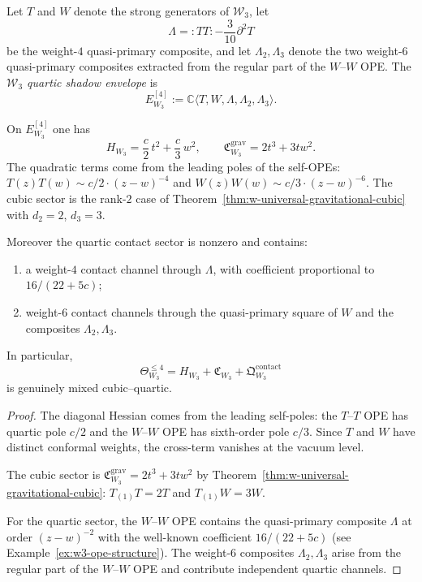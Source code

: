 \begin{definition}
\label{def:w-w3-quartic-envelope}
Let $T$ and $W$ denote the strong generators of $\mathcal{W}_3$, let
\[
\Lambda={:}TT{:}-\frac{3}{10}\partial^2T
\]
be the weight-$4$ quasi-primary composite, and let $\Lambda_2,\Lambda_3$
denote the two weight-$6$ quasi-primary composites extracted from the
regular part of the $W$--$W$ OPE.  The \emph{$\mathcal{W}_3$ quartic
shadow envelope} is
\[
E^{[4]}_{W_3}
:=\mathbb C\langle T,W,\Lambda,\Lambda_2,\Lambda_3\rangle.
\]
\end{definition}

\begin{theorem}
\label{thm:w-w3-mixed-shadow}
On $E^{[4]}_{W_3}$ one has
\begin{equation}
\label{eq:w-w3-hessian-cubic}
H_{W_3}=\frac c2\,t^2+\frac c3\,w^2,
\qquad
\mathfrak C^{\mathrm{grav}}_{W_3}=2t^3+3tw^2.
\end{equation}
The quadratic terms come from the leading poles of the self-OPEs:
$T(z)T(w)\sim c/2\cdot(z-w)^{-4}$ and $W(z)W(w)\sim c/3\cdot(z-w)^{-6}$.
The cubic sector is the rank-$2$ case of
Theorem~\ref{thm:w-universal-gravitational-cubic} with $d_2=2$, $d_3=3$.

Moreover the quartic contact sector is nonzero and contains:
\begin{enumerate}[label=\textup{(\roman*)}]
\item a weight-$4$ contact channel through $\Lambda$, with coefficient
  proportional to $16/(22+5c)$;
\item weight-$6$ contact channels through the quasi-primary square of
  $W$ and the composites $\Lambda_2,\Lambda_3$.
\end{enumerate}
In particular,
\begin{equation}
\label{eq:w-w3-mixed-shadow}
\Theta_{W_3}^{\le 4}
=H_{W_3}+\mathfrak C_{W_3}
+\mathfrak Q_{W_3}^{\mathrm{contact}}
\end{equation}
is genuinely mixed cubic--quartic.
\end{theorem}

\begin{proof}
The diagonal Hessian comes from the leading self-poles: the
$T$--$T$ OPE has quartic pole $c/2$ and the $W$--$W$ OPE has
sixth-order pole $c/3$.  Since $T$ and $W$ have distinct conformal
weights, the cross-term vanishes at the vacuum level.

The cubic sector is
$\mathfrak C^{\mathrm{grav}}_{W_3}=2t^3+3tw^2$ by
Theorem~\ref{thm:w-universal-gravitational-cubic}: $T_{(1)}T=2T$ and
$T_{(1)}W=3W$.

For the quartic sector, the $W$--$W$ OPE contains the quasi-primary
composite $\Lambda$ at order $(z-w)^{-2}$ with the well-known coefficient
$16/(22+5c)$ (see Example~\ref{ex:w3-ope-structure}).  The weight-$6$ composites
$\Lambda_2,\Lambda_3$ arise from the regular part of the $W$--$W$ OPE
and contribute independent quartic channels.\qedhere
\end{proof}

